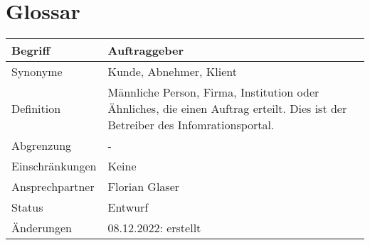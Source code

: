\section*{Glossar}\label{cha:glossar}


\begin{table}[H]
    \centering
    \label{gls:auftraggeber}
    \begin{tabularx}{\textwidth}{| l | X |}
        \hline
        Begriff         & Auftraggeber                                                                                                                   \\
        \hline
        Synonyme        & Kunde, Abnehmer, Klient                                                                                                        \\
        \hline
        Definition      & Männliche Person, Firma, Institution oder Ähnliches, die einen Auftrag erteilt. Dies ist der Betreiber des Infomrationsportal. \\
        \hline
        Abgrenzung      & -                                                                                                                              \\
        \hline
        Einschränkungen & Keine                                                                                                                          \\
        \hline
        Ansprechpartner & Florian Glaser                                                                                                                 \\
        \hline
        Status          & Entwurf                                                                                                                        \\
        \hline
        Änderungen      & 08.12.2022: erstellt                                                                                                           \\
        \hline
    \end{tabularx}
\end{table}


